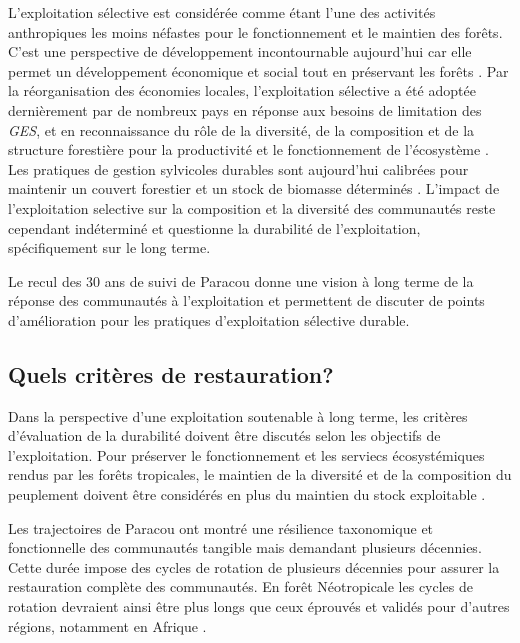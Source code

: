 \documentclass[
  11pt,
  french,
  A4paper,
  extrafontsizes,onecolumn,openright
  ]{memoir}
\begin{document}
L'exploitation sélective est considérée comme étant l'une des activités
anthropiques les moins néfastes pour le fonctionnement et le maintien
des forêts. C'est une perspective de développement incontournable
aujourd'hui car elle permet un développement économique et social tout
en préservant les forêts \autocite{Chaudhary2016}. Par la réorganisation
des économies locales, l'exploitation sélective a été adoptée
dernièrement par de nombreux pays en réponse aux besoins de limitation
des \emph{GES}, et en reconnaissance du rôle de la diversité, de la
composition et de la structure forestière pour la productivité et le
fonctionnement de l'écosystème \autocite{Begon2006}. Les pratiques de
gestion sylvicoles durables sont aujourd'hui calibrées pour maintenir un
couvert forestier et un stock de biomasse déterminés
\autocite{ITTO2005}. L'impact de l'exploitation selective sur la
composition et la diversité des communautés reste cependant indéterminé
et questionne la durabilité de l'exploitation, spécifiquement sur le
long terme.

Le recul des 30 ans de suivi de Paracou donne une vision à long terme de
la réponse des communautés à l'exploitation et permettent de discuter de
points d'amélioration pour les pratiques d'exploitation sélective
durable.

\subsection{Quels critères de
restauration?}\label{quels-criteres-de-restauration}

Dans la perspective d'une exploitation soutenable à long terme, les
critères d'évaluation de la durabilité doivent être discutés selon les
objectifs de l'exploitation. Pour préserver le fonctionnement et les
serviecs écosystémiques rendus par les forêts tropicales, le maintien de
la diversité et de la composition du peuplement doivent être considérés
en plus du maintien du stock exploitable
\autocites{ITTO2005}{Barlow2018}.

Les trajectoires de Paracou ont montré une résilience taxonomique et
fonctionnelle des communautés tangible mais demandant plusieurs
décennies. Cette durée impose des cycles de rotation de plusieurs
décennies pour assurer la restauration complète des communautés. En
forêt Néotropicale les cycles de rotation devraient ainsi être plus
longs que ceux éprouvés et validés pour d'autres régions, notamment en
Afrique \autocite{Durrieu1998}.
\end{document}
